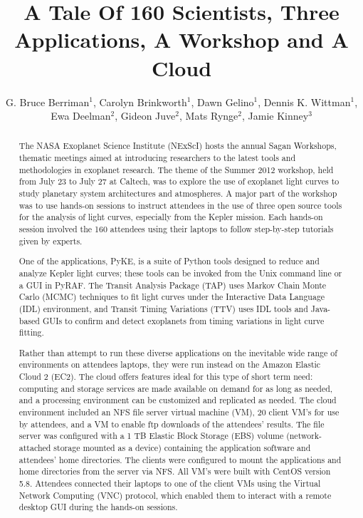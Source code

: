 \documentclass[11pt,twoside]{article}
\begin{document}
\title{A Tale Of 160 Scientists, Three Applications, A Workshop and A Cloud}
\author{G. Bruce Berriman$^1$, Carolyn Brinkworth$^1$, Dawn Gelino$^1$, Dennis K. Wittman$^1$, Ewa Deelman$^2$, Gideon Juve$^2$, Mats Rynge$^2$, Jamie Kinney$^3$
}

\begin{abstract}
The NASA Exoplanet Science Institute (NExScI) hosts the annual Sagan Workshops, thematic meetings aimed at introducing researchers to the latest tools and methodologies in exoplanet research. The theme of the Summer 2012 workshop, held from July 23 to July 27 at Caltech, was to explore the use of exoplanet light curves to study planetary system architectures and atmospheres. A major part of the workshop was to use hands-on sessions to instruct attendees in the use of three open source tools for the analysis of light curves, especially from the Kepler mission. Each hands-on session involved the 160 attendees using their laptops to follow step-by-step tutorials given by experts. 

One of the applications, PyKE, is a suite of Python tools designed to reduce and analyze Kepler light curves; these tools can be invoked from the Unix command line or a GUI in PyRAF. The Transit Analysis Package (TAP) uses Markov Chain Monte Carlo (MCMC) techniques to fit light curves under the Interactive Data Language (IDL) environment, and Transit Timing Variations (TTV) uses IDL tools and Java-based GUIs to confirm and detect exoplanets from timing variations in light curve fitting. 

Rather than attempt to run these diverse applications on the inevitable wide range of environments on attendees laptops, they were run instead on the Amazon Elastic Cloud 2 (EC2). The cloud offers features ideal for this type of short term need: computing and storage services are made available on demand for as long as needed, and a processing environment can be customized and replicated as needed. The cloud environment included an NFS file server virtual machine (VM), 20 client VM’s for use by attendees, and a VM to enable ftp downloads of the attendees' results. The file server was configured with a 1 TB Elastic Block Storage (EBS) volume (network-attached storage mounted as a device) containing the application software and attendees’ home directories. The clients were configured to mount the applications and home directories from the server via NFS. All VM’s were built with CentOS version 5.8. Attendees connected their laptops to one of the client VMs using the Virtual Network Computing (VNC) protocol, which enabled them to interact with a remote desktop GUI during the hands-on sessions. 


\end{abstract}
\end{document}
